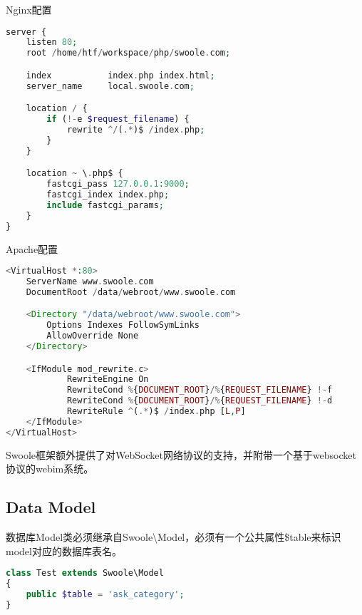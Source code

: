 \begin{compactitem}
\item Nginx配置

\begin{lstlisting}[language=PHP]
server {
    listen 80;
    root /home/htf/workspace/php/swoole.com;

    index           index.php index.html;
    server_name     local.swoole.com;

    location / {
        if (!-e $request_filename) {
            rewrite ^/(.*)$ /index.php;
        }
    }

    location ~ \.php$ {
        fastcgi_pass 127.0.0.1:9000;
        fastcgi_index index.php;
        include fastcgi_params;
    }
}
\end{lstlisting}

\item Apache配置

\begin{lstlisting}[language=PHP]
<VirtualHost *:80>
    ServerName www.swoole.com
    DocumentRoot /data/webroot/www.swoole.com

    <Directory "/data/webroot/www.swoole.com">
        Options Indexes FollowSymLinks
        AllowOverride None
    </Directory>

    <IfModule mod_rewrite.c>
            RewriteEngine On
            RewriteCond %{DOCUMENT_ROOT}/%{REQUEST_FILENAME} !-f
            RewriteCond %{DOCUMENT_ROOT}/%{REQUEST_FILENAME} !-d
            RewriteRule ^(.*)$ /index.php [L,P]
    </IfModule>
</VirtualHost>
\end{lstlisting}
\end{compactitem}

Swoole框架额外提供了对WebSocket网络协议的支持，并附带一个基于websocket协议的webim系统。




\subsection{Data Model}




数据库Model类必须继承自Swoole\textbackslash Model，必须有一个公共属性\$table来标识model对应的数据库表名。



\begin{lstlisting}[language=PHP]
class Test extends Swoole\Model
{
	public $table = 'ask_category';
}
\end{lstlisting}

